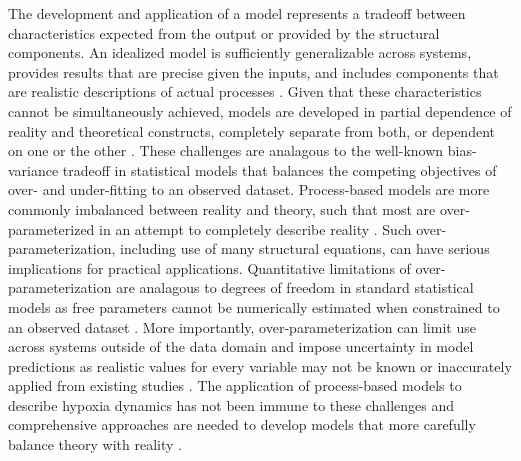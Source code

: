 \documentclass[letterpaper,12pt,oneside]{article}\usepackage[]{graphicx}\usepackage[]{color}
\begin{document}
The development and application of a model represents a tradeoff between characteristics expected from the output or provided by the structural components. An idealized model is sufficiently generalizable across systems, provides results that are precise given the inputs, and includes components that are realistic descriptions of actual processes \citep{Levins66}. Given that these characteristics cannot be simultaneously achieved, models are developed in partial dependence of reality and theoretical constructs, completely separate from both, or dependent on one or the other \citep{Morrison99,Ganju16}.  These challenges are analagous to the well-known bias-variance tradeoff in statistical models that balances the competing objectives of over- and under-fitting to an observed dataset. Process-based models are more commonly imbalanced between reality and theory, such that most are over-parameterized in an attempt to completely describe reality \citep{Denman03,Nossent12,Petrucci14}.  Such over-parameterization, including use of many  structural equations, can have serious implications for practical applications.  Quantitative limitations of over-parameterization are analagous to degrees of freedom in standard statistical models as free parameters cannot be numerically estimated when constrained to an observed dataset \citep{Kirchner06}.  More importantly, over-parameterization can limit use across systems outside of the data domain and impose uncertainty in model predictions as realistic values for every variable may not be known or inaccurately applied from existing studies \citep{Durand02,Refsgaard07,Wade08}. The application of process-based models to describe hypoxia dynamics has not been immune to these challenges and comprehensive approaches are needed to develop models that more carefully balance theory with reality \citep[e.g.,][]{Snowling01}.  
\end{document}
